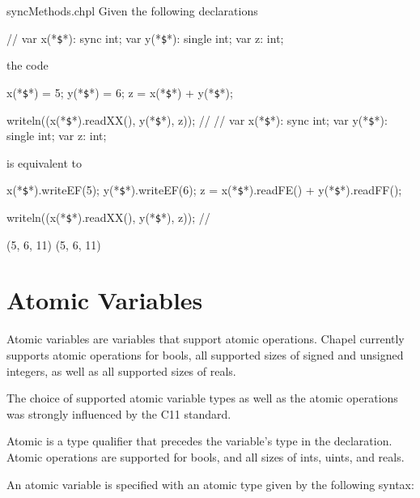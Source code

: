 \begin{chapelexample}{syncMethods.chpl}
Given the following declarations
\begin{chapel}
{ // }
var x(*\texttt{\$}*): sync int;
var y(*\texttt{\$}*): single int;
var z: int;
\end{chapel}
the code
\begin{chapel}
x(*\texttt{\$}*) = 5;
y(*\texttt{\$}*) = 6;
z = x(*\texttt{\$}*) + y(*\texttt{\$}*);
\end{chapel}
\begin{chapelnoprint}
writeln((x(*\texttt{\$}*).readXX(), y(*\texttt{\$}*), z));
// {
}
{ // }
var x(*\texttt{\$}*): sync int;
var y(*\texttt{\$}*): single int;
var z: int;
\end{chapelnoprint}
is equivalent to
\begin{chapel}
x(*\texttt{\$}*).writeEF(5);
y(*\texttt{\$}*).writeEF(6);
z = x(*\texttt{\$}*).readFE() + y(*\texttt{\$}*).readFF();
\end{chapel}
\begin{chapelpost}
writeln((x(*\texttt{\$}*).readXX(), y(*\texttt{\$}*), z));
// {
}
\end{chapelpost}
\begin{chapeloutput}
(5, 6, 11)
(5, 6, 11)
\end{chapeloutput}
\end{chapelexample}



\section{Atomic Variables}
\label{Atomic_Variables}

Atomic variables are variables that support atomic operations. Chapel
currently supports atomic operations for bools, all supported sizes of
signed and unsigned integers, as well as all supported sizes of reals. 

\begin{rationale}
The choice of supported atomic variable types as well as the atomic
operations was strongly influenced by the C11 standard.
\end{rationale}

Atomic is a type qualifier that precedes the variable's type in
the declaration. Atomic operations are supported for bools, and all
sizes of ints, uints, and reals.  

An atomic variable is specified with an atomic type given by the 
following syntax:

